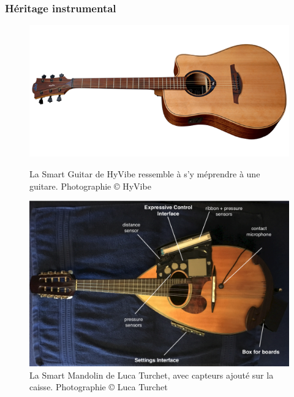 \subsubsection{Héritage instrumental}
\label{sec:interfaces:heritages:instrument}
\begin{figure}[!htbp]
	\captionsetup{format=plain}%
	\centering
	\begin{minipage}[t]{0.48\textwidth}
		\includegraphics[width=\linewidth]{gfx/05_interfaces/HyVibe-guitar.png}
		\caption[La Smart Guitar de HyVibe]{La Smart Guitar de HyVibe ressemble à s'y méprendre à une guitare. Photographie © HyVibe}
		\label{fig:interface:hyvibe}
	\end{minipage}
	\hspace{.02\linewidth}
	\begin{minipage}[t]{0.48\textwidth}
	    \includegraphics[width=\linewidth]{gfx/05_interfaces/Turchet-SmartMandolin.png}
		\caption[La Smart Mandolin de Luca Turchet]{La Smart Mandolin de Luca Turchet, avec capteurs ajouté sur la caisse. Photographie © Luca Turchet}
		\label{fig:interface:smart-mandolin}
	\end{minipage}
\end{figure}
